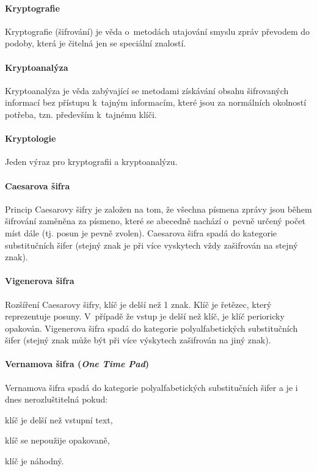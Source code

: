 \paragraph*{Kryptografie} Kryptografie (šifrování) je věda o~metodách utajování smyslu zpráv převodem do podoby, která je čitelná jen se speciální znalostí.

\paragraph*{Kryptoanalýza} Kryptoanalýza je věda zabývající se metodami získávání obsahu šifrovaných informací bez přístupu k~tajným informacím, které jsou za normálních okolností potřeba, tzn. především k~tajnému klíči.

\paragraph*{Kryptologie} Jeden výraz pro kryptografii a kryptoanalýzu.

\paragraph*{Caesarova šifra} Princip Caesarovy šifry je založen na tom, že všechna písmena zprávy jsou během šifrování zaměněna za písmeno, které se abecedně nachází o~pevně určený počet míst dále (tj. posun je pevně zvolen). Caesarova šifra spadá do kategorie substitučních šifer (stejný znak je při více vyskytech vždy zašifrován na stejný znak).

\paragraph*{Vigenerova šifra} Rozšíření Caesarovy šifry, klíč je delší než 1 znak. Klíč je řetězec, který reprezentuje posuny. V~případě že vstup je delší než klíč, je klíč perioricky opakován. Vigenerova šifra spadá do kategorie polyalfabetických substitučních šifer (stejný znak může být při více výskytech zašifrován na jiný znak).

\paragraph*{Vernamova šifra (\textit{One Time Pad})} Vernamova šifra spadá do kategorie polyalfabetických substitučních šifer a je i dnes nerozluštitelná pokud: \begin{compactitem}
    \item klíč je delší než vstupní text,
    \item klíč se nepoužije opakovaně,
    \item klíč je náhodný.
\end{compactitem}

